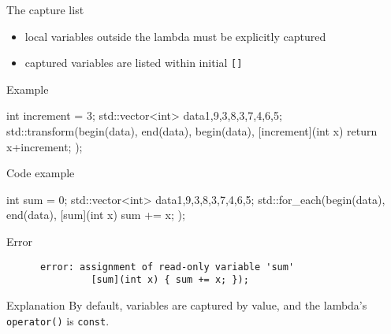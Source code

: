 \begin{frame}[fragile]
  \begin{block}{The capture list}
    \begin{itemize}
    \item local variables outside the lambda must be explicitly captured
    \item captured variables are listed within initial \texttt{[]}
    \end{itemize}
  \end{block}
  \pause
  \begin{exampleblock}{Example}
    \begin{cppcode*}{}
      int increment = 3;
      std::vector<int> data{1,9,3,8,3,7,4,6,5};
      std::transform(begin(data), end(data), begin(data),
                     [increment](int x) {
                       return x+increment;
                     });
    \end{cppcode*}
  \end{exampleblock}
\end{frame}

\begin{frame}[fragile]
  \begin{exampleblock}{Code example}
    \begin{cppcode}
      int sum = 0;
      std::vector<int> data{1,9,3,8,3,7,4,6,5};
      std::for_each(begin(data), end(data),
                   [sum](int x) { sum += x; });
    \end{cppcode}
  \end{exampleblock}
  \pause
  \begin{alertblock}{Error}
    \begin{verbatim}
      error: assignment of read-only variable 'sum'
               [sum](int x) { sum += x; });
    \end{verbatim}
  \end{alertblock}
  \pause
  \begin{block}{Explanation}
    By default, variables are captured by value, and the lambda's \texttt{operator()} is \texttt{const}.
  \end{block}
\end{frame}

